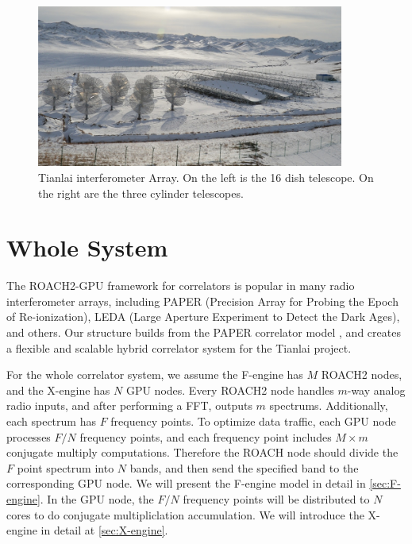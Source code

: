\documentclass{ws-jai}
\begin{document}
\begin{figure}[t]
 \centering
 \includegraphics[width=0.9\textwidth]{./picture/Tianlai.jpg}
\caption{Tianlai interferometer Array. On the left is the 16 dish telescope. On the right are the three cylinder telescopes.\label{fig:Tianlai}}
\end{figure}

\section{Whole System}\label{sec:1}
  

	The ROACH2-GPU framework for correlators is popular in many radio interferometer arrays, including PAPER (Precision Array for Probing the Epoch of Re-ionization)\cite{2010AJ....139.1468P}, LEDA (Large Aperture Experiment to Detect the Dark Ages), and others. Our structure builds from the PAPER correlator model \cite{2008PASP..120.1207P}, and creates a flexible and scalable hybrid correlator system for the Tianlai project.
	
	 For the whole correlator system, we assume the F-engine has $M$ ROACH2 nodes, and the X-engine has $N$ GPU nodes.  Every ROACH2 node handles $m$-way analog radio inputs, and after performing a FFT, outputs $m$ spectrums. Additionally, each spectrum has $F$ frequency points. To optimize data traffic, each GPU node processes ${F}/{N}$ frequency points, and each frequency point includes $M\times m$ conjugate multiply computations. Therefore the ROACH node should divide the $F$ point spectrum into $N$ bands, and then send the specified band to the corresponding GPU node. We will present the F-engine model in detail in \ref{sec:F-engine}. In the GPU node, the ${F}/{N}$ frequency points will be distributed to $N$ cores to do conjugate multipliclation accumulation. We will introduce the X-engine in detail at \ref{sec:X-engine}.            
	  
\end{document}
